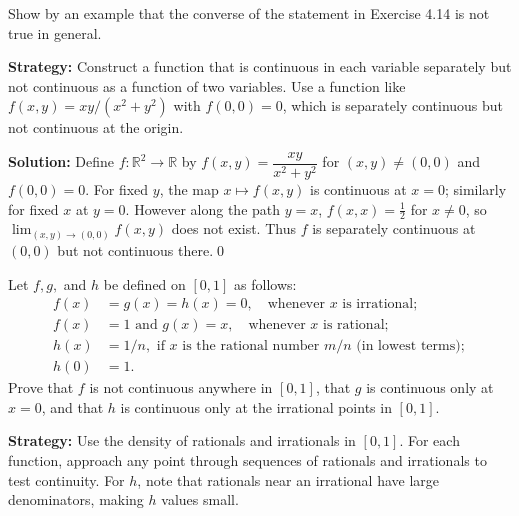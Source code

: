 \begin{problembox}
\begin{problemstatement}
Show by an example that the converse of the statement in Exercise 4.14 is not true in general.
\end{problemstatement}
\end{problembox}

\noindent\textbf{Strategy:} Construct a function that is continuous in each variable separately but not continuous as a function of two variables. Use a function like $f(x,y) = xy/(x^2+y^2)$ with $f(0,0) = 0$, which is separately continuous but not continuous at the origin.

\bigskip\noindent\textbf{Solution:}
Define $f:\mathbb{R}^2\to\mathbb{R}$ by $f(x,y)=\dfrac{xy}{x^2+y^2}$ for $(x,y)\ne(0,0)$ and $f(0,0)=0$. For fixed $y$, the map $x\mapsto f(x,y)$ is continuous at $x=0$; similarly for fixed $x$ at $y=0$. However along the path $y=x$, $f(x,x)=\tfrac{1}{2}$ for $x\ne0$, so $\lim_{(x,y)\to(0,0)}f(x,y)$ does not exist. Thus $f$ is separately continuous at $(0,0)$ but not continuous there.\qed



\begin{problembox}
\begin{problemstatement}
Let \( f, g, \) and \( h \) be defined on \([0, 1]\) as follows:
\begin{align*}
f(x) &= g(x) = h(x) = 0, \quad \text{whenever } x \text{ is irrational}; \\
f(x) &= 1 \text{ and } g(x) = x, \quad \text{whenever } x \text{ is rational}; \\
h(x) &= 1/n, \text{ if } x \text{ is the rational number } m/n \text{ (in lowest terms)}; \\
h(0) &= 1.
\end{align*}
Prove that \( f \) is not continuous anywhere in \([0, 1]\), that \( g \) is continuous only at \( x = 0 \), and that \( h \) is continuous only at the irrational points in \([0, 1]\).
\end{problemstatement}
\end{problembox}

\noindent\textbf{Strategy:} Use the density of rationals and irrationals in $[0,1]$. For each function, approach any point through sequences of rationals and irrationals to test continuity. For $h$, note that rationals near an irrational have large denominators, making $h$ values small.

